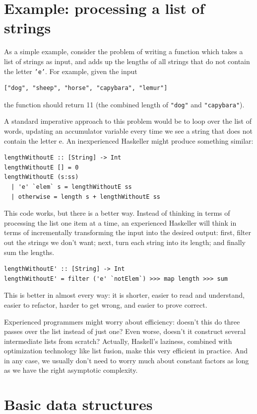 \documentclass{book}
\newcommand{\h}[1]{\texttt{#1}}
\begin{document}
\section{Example: processing a list of strings}

As a simple example, consider the problem of writing a function which
takes a list of strings as input, and adds up the lengths of all
strings that do not contain the letter \h{'e'}.  For example, given
the input
\begin{verbatim}
["dog", "sheep", "horse", "capybara", "lemur"]
\end{verbatim}
the function should return 11 (the combined length of \h{"dog"} and
\h{"capybara"}).

A standard imperative approach to this problem would be to loop over
the list of words, updating an accumulator variable every time we see
a string that does not contain the letter e.  An inexperienced
Haskeller might produce something similar:
\begin{verbatim}
lengthWithoutE :: [String] -> Int
lengthWithoutE [] = 0
lengthWithoutE (s:ss)
  | 'e' `elem` s = lengthWithoutE ss
  | otherwise = length s + lengthWithoutE ss
\end{verbatim}
This code works, but there is a better way.  Instead of thinking in
terms of processing the list one item at a time, an experienced
Haskeller will think in terms of incrementally transforming the input
into the desired output: first, filter out the strings we don't want;
next, turn each string into its length; and finally sum the lengths.
\begin{verbatim}
lengthWithoutE' :: [String] -> Int
lengthWithoutE' = filter ('e' `notElem`) >>> map length >>> sum
\end{verbatim}
This is better in almost every way: it is shorter, easier to read and
understand, easier to refactor, harder to get wrong, and easier to
prove correct.

Experienced programmers might worry about efficiency: doesn't this do
three passes over the list instead of just one?  Even worse, doesn't
it construct several intermediate lists from scratch?  Actually,
Haskell's laziness, combined with optimization technology like list
fusion, make this very efficient in practice.  And in any case, we
usually don't need to worry much about constant factors as long as we
have the right asymptotic complexity.

\section{Basic data structures}
\end{document}
